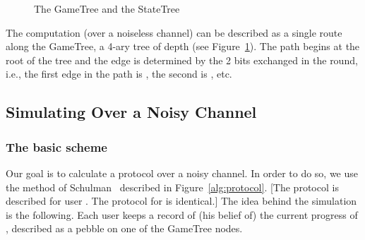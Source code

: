 \documentclass[ letterpaper, 11pt]{article}
\newcommand{\gametree}{\textsf{GameTree}\xspace}
\newcommand{\statetree}{{\textsf{StateTree}}\xspace}
\begin{document}
\begin{figure}[htb]
\begin{framed}
\end{framed}
\caption{The \gametree and the \statetree}
\label{fig:trees}
\end{figure}
The computation (over a noiseless channel) can be described as a single route 
along the \gametree,
a 4-ary tree of depth  (see Figure~\ref{fig:trees}). The path  begins
at the root of the tree
and the  edge is determined by the 2 bits exchanged in the  round,
i.e., the first edge in the path is , the second
is , etc.






\subsection{Simulating  Over a Noisy Channel}



\subsubsection{The basic scheme}\label{sec:basicScheme}
Our goal is to calculate a protocol  over a noisy channel. In order to do so, we use the method
of Schulman~\cite{schulman96} described in Figure~\ref{alg:protocol}.
[The protocol is described for user . The protocol for  is identical.]
The idea behind the simulation is the following.
Each user keeps a record of  (his belief of) the  current progress of ,
described as a pebble on one of the \gametree nodes.
\end{document}
